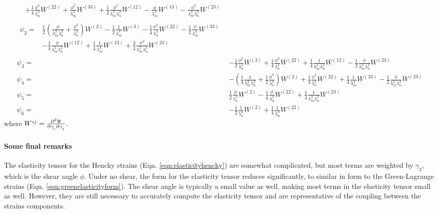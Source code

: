 \begin{subequations}
\begin{align}
\begin{split}
        &+\frac{1}{4}\frac{\phi^4}{\lambda_n^4}W^{(22)}
        +\frac{\phi^2}{\lambda_m^4}W^{(33)}
        +\frac{1}{2}\frac{\phi^2}{\lambda_m^2\lambda_n^2}W^{(12)}
        -\frac{\phi}{\lambda_m^4}W^{(13)}
        -\frac{\phi^3}{\lambda_m^2 \lambda_n^2}W^{(23)}
\end{split}	\\
\begin{split}
\psi_2 =&
        \frac{1}{2}\left(\frac{\phi}{\lambda_m^2\lambda_n^2} + \frac{\phi^3}{\lambda_n^4}\right)W^{(2)}
        -\frac{1}{2}\frac{1}{\lambda_m^4}W^{(3)}
        -\frac{1}{4}\frac{\phi^3}{\lambda_n^4}W^{(22)}
        -\frac{1}{2}\frac{\phi}{\lambda_m^4}W^{(33)}    \\
        &-\frac{1}{4}\frac{\phi}{\lambda_m^2 \lambda_n^2}W^{(12)}
        +\frac{1}{4}\frac{1}{\lambda_m^4}W^{(13)}
        +\frac{3}{4}\frac{\phi^2}{\lambda_m^2 \lambda_n^2}W^{(23)}
\end{split}	\\
\psi_3 =&
        -\frac{1}{2}\frac{\phi^2}{\lambda_n^4}W^{(2)}
        +\frac{1}{4}\frac{\phi^2}{\lambda_n^4}W^{(22)}
        +\frac{1}{4}\frac{1}{\lambda_m^2 \lambda_n^2}W^{(12)}
        -\frac{1}{2}\frac{\phi}{\lambda_m^2 \lambda_n^2}W^{(23)}	\\
\psi_4 =&
        -\left(\frac{1}{4}\frac{1}{\lambda_m^2\lambda_n^2}+\frac{1}{2}\frac{\phi^2}{\lambda_n^4}\right)W^{(2)}
        +\frac{1}{4}\frac{\phi^2}{\lambda_n^4}W^{(22)}
        +\frac{1}{4}\frac{1}{\lambda_m^4}W^{(33)}
        -\frac{1}{2}\frac{\phi}{\lambda_m^2 \lambda_n^2}W^{(23)}	\\
\psi_5 =&
        \frac{1}{2}\frac{\phi}{\lambda_n^4}W^{(2)}
        -\frac{1}{4}\frac{\phi}{\lambda_n^4}W^{(22)}
        +\frac{1}{4}\frac{1}{\lambda_m^2 \lambda_n^2}W^{(23)}	\\
\psi_6 =&
        -\frac{1}{2}\frac{1}{\lambda_n^4}W^{(2)}
        +\frac{1}{4}\frac{1}{\lambda_n^4}W^{(22)}
\end{align}
\end{subequations}
where $W^{ij} = \md{\Psi}{2}{\gamma_i}{}{\gamma_j}{}$.

\paragraph{Some final remarks} 
	The elasticity tensor for the Hencky strains (Eqn. \ref{eqn:elasticityhencky}) are somewhat complicated, but most terms are weighted by $\gamma_3$, which is the shear angle $\phi$. Under no shear, the form for the elasticity tensor reduces significantly, to similar in form to the Green-Lagrange strains (Eqn. \ref{eqn:greenelasticityform}). The shear angle is typically a small value as well, making most terms in the elasticity tensor small as well. However, they are still necessary to accurately compute the elasticity tensor and are representative of the coupling between the strains components. 
    
